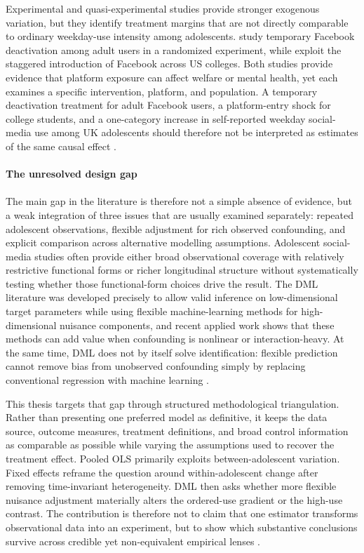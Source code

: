 \documentclass[11pt,oneside,a4paper]{book}
\begin{document}
Experimental and quasi-experimental studies provide stronger exogenous variation, but they identify treatment margins that are not directly comparable to ordinary weekday-use intensity among adolescents. \citet{allcott2020welfare} study temporary Facebook deactivation among adult users in a randomized experiment, while \citet{braghieri2022socialmedia} exploit the staggered introduction of Facebook across US colleges. Both studies provide evidence that platform exposure can affect welfare or mental health, yet each examines a specific intervention, platform, and population. A temporary deactivation treatment for adult Facebook users, a platform-entry shock for college students, and a one-category increase in self-reported weekday social-media use among UK adolescents should therefore not be interpreted as estimates of the same causal effect \citep{allcott2020welfare,braghieri2022socialmedia}. \\
\\
\textbf{The unresolved design gap}\\
\\
The main gap in the literature is therefore not a simple absence of evidence, but a weak integration of three issues that are usually examined separately: repeated adolescent observations, flexible adjustment for rich observed confounding, and explicit comparison across alternative modelling assumptions. Adolescent social-media studies often provide either broad observational coverage with relatively restrictive functional forms or richer longitudinal structure without systematically testing whether those functional-form choices drive the result. The DML literature was developed precisely to allow valid inference on low-dimensional target parameters while using flexible machine-learning methods for high-dimensional nuisance components, and recent applied work shows that these methods can add value when confounding is nonlinear or interaction-heavy. At the same time, DML does not by itself solve identification: flexible prediction cannot remove bias from unobserved confounding simply by replacing conventional regression with machine learning \citep{chernozhukov2018dml,baiardi2024valueadded,fuhr2024dml}. 

This thesis targets that gap through structured methodological triangulation. Rather than presenting one preferred model as definitive, it keeps the data source, outcome measures, treatment definitions, and broad control information as comparable as possible while varying the assumptions used to recover the treatment effect. Pooled OLS primarily exploits between-adolescent variation. Fixed effects reframe the question around within-adolescent change after removing time-invariant heterogeneity. DML then asks whether more flexible nuisance adjustment materially alters the ordered-use gradient or the high-use contrast. The contribution is therefore not to claim that one estimator transforms observational data into an experiment, but to show which substantive conclusions survive across credible yet non-equivalent empirical lenses \citep{chernozhukov2018dml,baiardi2024valueadded,fuhr2024dml}. 
\end{document}
